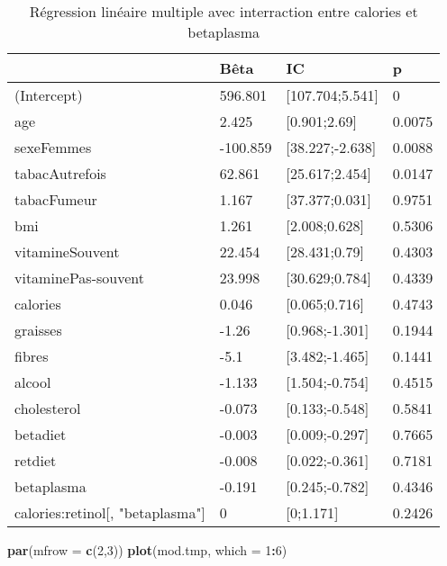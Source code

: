 \documentclass[]{article}
\newenvironment{Shaded}{\begin{snugshade}}{\end{snugshade}}
\newcommand{\KeywordTok}[1]{\textcolor[rgb]{0.13,0.29,0.53}{\textbf{#1}}}
\newcommand{\DataTypeTok}[1]{\textcolor[rgb]{0.13,0.29,0.53}{#1}}
\newcommand{\DecValTok}[1]{\textcolor[rgb]{0.00,0.00,0.81}{#1}}
\newcommand{\OperatorTok}[1]{\textcolor[rgb]{0.81,0.36,0.00}{\textbf{#1}}}
\newcommand{\NormalTok}[1]{#1}
\begin{document}
\begin{table}

\caption{\label{tab:unnamed-chunk-74}Régression linéaire multiple avec interraction entre calories et betaplasma}
\centering
\begin{tabular}[t]{l|l|l|l}
\hline
  & Bêta & IC & p\\
\hline
\rowcolor[HTML]{BBD2E1}  (Intercept) & 596.801 & [107.704;5.541] & 0\\
\hline
age & 2.425 & [0.901;2.69] & 0.0075\\
\hline
\rowcolor[HTML]{BBD2E1}  sexeFemmes & -100.859 & [38.227;-2.638] & 0.0088\\
\hline
tabacAutrefois & 62.861 & [25.617;2.454] & 0.0147\\
\hline
\rowcolor[HTML]{BBD2E1}  tabacFumeur & 1.167 & [37.377;0.031] & 0.9751\\
\hline
bmi & 1.261 & [2.008;0.628] & 0.5306\\
\hline
\rowcolor[HTML]{BBD2E1}  vitamineSouvent & 22.454 & [28.431;0.79] & 0.4303\\
\hline
vitaminePas-souvent & 23.998 & [30.629;0.784] & 0.4339\\
\hline
\rowcolor[HTML]{BBD2E1}  calories & 0.046 & [0.065;0.716] & 0.4743\\
\hline
graisses & -1.26 & [0.968;-1.301] & 0.1944\\
\hline
\rowcolor[HTML]{BBD2E1}  fibres & -5.1 & [3.482;-1.465] & 0.1441\\
\hline
alcool & -1.133 & [1.504;-0.754] & 0.4515\\
\hline
\rowcolor[HTML]{BBD2E1}  cholesterol & -0.073 & [0.133;-0.548] & 0.5841\\
\hline
betadiet & -0.003 & [0.009;-0.297] & 0.7665\\
\hline
\rowcolor[HTML]{BBD2E1}  retdiet & -0.008 & [0.022;-0.361] & 0.7181\\
\hline
betaplasma & -0.191 & [0.245;-0.782] & 0.4346\\
\hline
\rowcolor[HTML]{BBD2E1}  calories:retinol[, "betaplasma"] & 0 & [0;1.171] & 0.2426\\
\hline
\end{tabular}
\end{table}

\begin{Shaded}
\begin{Highlighting}[]
\KeywordTok{par}\NormalTok{(}\DataTypeTok{mfrow =} \KeywordTok{c}\NormalTok{(}\DecValTok{2}\NormalTok{,}\DecValTok{3}\NormalTok{))}
\KeywordTok{plot}\NormalTok{(mod.tmp, }\DataTypeTok{which =} \DecValTok{1}\OperatorTok{:}\DecValTok{6}\NormalTok{)}
\end{Highlighting}
\end{Shaded}
\end{document}

